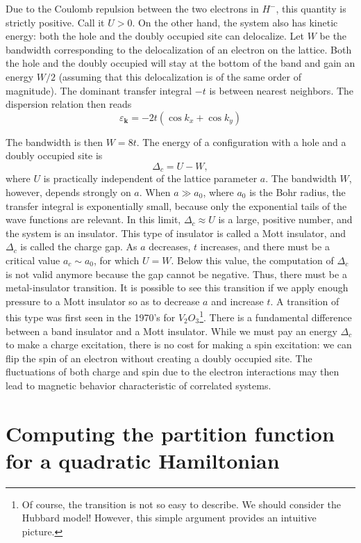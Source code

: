 Due to the Coulomb repulsion between the two electrons in $H^-$, this quantity is strictly positive.
Call it $U > 0$.
On the other hand, the system also has kinetic energy: both the hole and the doubly occupied site can delocalize.
Let $W$ be the bandwidth corresponding to the delocalization of an electron on the lattice.
Both the hole and the doubly occupied will stay at the bottom of the band and gain an energy $W/2$ (assuming that this delocalization is of the same order of magnitude).
The dominant transfer integral $-t$ is between nearest neighbors.
The dispersion relation then reads
\begin{equation}
\varepsilon_{\bm k} = -2 t ( \cos k_x + \cos k_y ) 
\end{equation}

The bandwidth is then $W = 8 t$.
The energy of a configuration with a hole and a doubly occupied site is
\begin{equation}
\Delta_c = U - W ,
\end{equation}
where $U$ is practically independent of the lattice parameter $a$.
The bandwidth $W$, however, depends strongly on $a$.
When $a \gg a_0$, where $a_0$ is the Bohr radius, the transfer integral is exponentially small, because only the exponential tails of the wave functions are relevant.
In this limit, $\Delta_c \approx U$ is a large, positive number, and the system is an insulator.
This type of insulator is called a Mott insulator, and $\Delta_c$ is called the charge gap.
As $a$ decreases, $t$ increases, and there must be a critical value $a_c \sim a_0$, for which $U = W$.
Below this value, the computation of $\Delta_c$ is not valid anymore because the gap cannot be negative.
Thus, there must be a metal-insulator transition.
It is possible to see this transition if we apply enough pressure to a Mott insulator so as to decrease $a$ and increase $t$.
A transition of this type was first seen in the 1970's for $V_2 O_3$\footnote{Of course, the transition is not so easy to describe. We should consider the Hubbard model!
However, this simple argument provides an intuitive picture.}.
There is a fundamental difference between a band insulator and a Mott insulator.
While we must pay an energy $\Delta_c$ to make a charge excitation, there is no cost for making a spin excitation: we can flip the spin of an electron without creating a doubly occupied site.
The fluctuations of both charge and spin due to the electron interactions may then lead to magnetic behavior characteristic of correlated  systems.

\section{Computing the partition function for a quadratic Hamiltonian}
\label{sec:Zquadratic}


